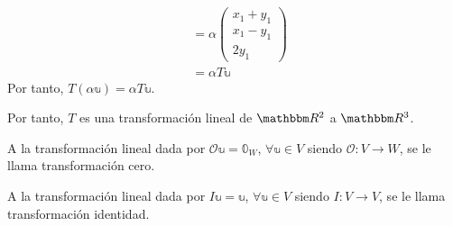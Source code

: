 \begin{example}
\begin{enumerate}[label=\roman*)]
\begin{align*}
            & = \alpha \begin{pmatrix}
                x_1 + y_1 \\
                x_1 - y_1 \\
                2 y_1
            \end{pmatrix} \\
            & = \alpha T \mathbb{u}
        \end{align*}
        Por tanto, $T(\alpha \mathbb{u}) = \alpha T\mathbb{u}$.
    \end{enumerate}
    Por tanto, $T$ es una transformación lineal de $\RR[2]$ a $\RR[3]$.
\end{example}

\begin{definition}
    A la transformación lineal dada por $\mathcal{O} \mathbb{u} = \mathbb{0}_{W}$, $\forall \mathbb{u} \in V$ siendo $\mathcal{O}:V \longrightarrow W$, se le llama transformación cero.
\end{definition}

\begin{definition}
    A la transformación lineal dada por $I \mathbb{u} = \mathbb{u}$, $\forall \mathbb{u} \in V$ siendo $I:V \longrightarrow V$, se le llama transformación identidad.
\end{definition}

\newpage

